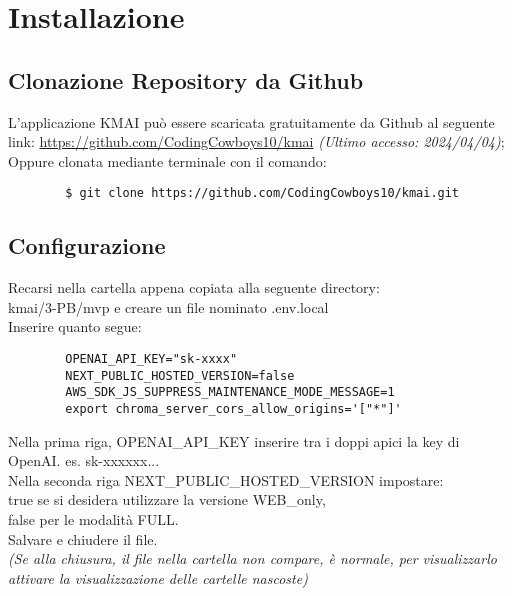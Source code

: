 \chapter{Installazione} \label{cap:Inst}
\section{Clonazione Repository da Github}
L'applicazione KMAI può essere scaricata gratuitamente da Github al seguente link: \url{https://github.com/CodingCowboys10/kmai} \textit{(Ultimo accesso: 2024/04/04)}; \\
Oppure clonata mediante terminale con il comando:
    \begin{lstlisting}
        $ git clone https://github.com/CodingCowboys10/kmai.git
    \end{lstlisting}

\section{Configurazione}
Recarsi nella cartella appena copiata alla seguente directory: \\
kmai/3-PB/mvp e creare un file nominato .env.local\\
Inserire quanto segue:
    \begin{lstlisting}
        OPENAI_API_KEY="sk-xxxx"
        NEXT_PUBLIC_HOSTED_VERSION=false
        AWS_SDK_JS_SUPPRESS_MAINTENANCE_MODE_MESSAGE=1
        export chroma_server_cors_allow_origins='["*"]'
    \end{lstlisting}
Nella prima riga, OPENAI\_API\_KEY inserire tra i doppi apici la key di OpenAI. es. sk-xxxxxx...\\
Nella seconda riga NEXT\_PUBLIC\_HOSTED\_VERSION impostare:\\ true se si desidera utilizzare la versione WEB\_only,\\ false per le modalità FULL.\\
Salvare e chiudere il file.\\
\textit{(Se alla chiusura, il file nella cartella non compare, è normale, per visualizzarlo attivare la visualizzazione delle cartelle nascoste)}

